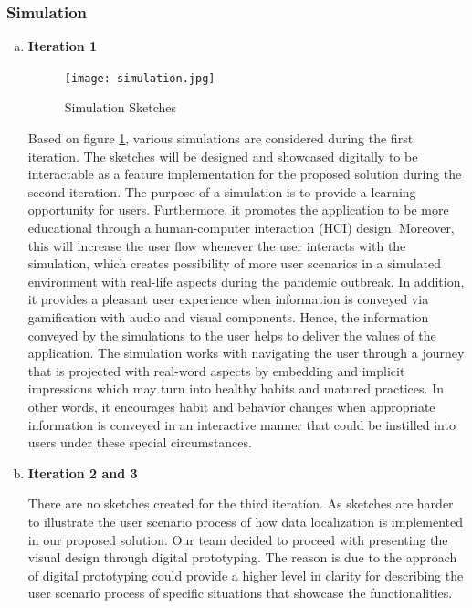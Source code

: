     \subsubsection{Simulation}
      \begin{enumerate}[a)]
        \item \textbf{Iteration 1}
          \begin{figure}[H]
            \centering
            \texttt{[image: simulation.jpg]}
            \caption{Simulation Sketches}
            \label{fig:simulation}
          \end{figure}
          \par Based on figure \ref{fig:simulation}, various simulations are considered during the first iteration. The sketches will be designed and showcased digitally to be interactable as a feature implementation for the proposed solution during the second iteration. The purpose of a simulation is to provide a learning opportunity for users. Furthermore, it promotes the application to be more educational through a human-computer interaction (HCI) design. Moreover, this will increase the user flow whenever the user interacts with the simulation, which creates possibility of more user scenarios in a simulated environment with real-life aspects during the pandemic outbreak. In addition, it provides a pleasant user experience when information is conveyed via gamification with audio and visual components. Hence, the information conveyed by the simulations to the user helps to deliver the values of the application. The simulation works with navigating the user through a journey that is projected with real-word aspects by embedding and implicit impressions which may turn into healthy habits and matured practices. In other words, it encourages habit and behavior changes when appropriate information is conveyed in an interactive manner that could be instilled into users under these special circumstances.
        \item \textbf{Iteration 2 and 3}
          \par There are no sketches created for the third iteration. As sketches are harder to illustrate the user
          scenario process of how data localization is implemented in our proposed solution. Our team decided
          to proceed with presenting the visual design through digital prototyping. The reason is due to the
          approach of digital prototyping could provide a higher level in clarity for describing the user scenario
          process of specific situations that showcase the functionalities.
      \end{enumerate}

